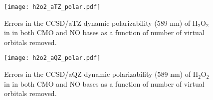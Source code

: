 \begin{figure}
  \centering
  \texttt{[image: h2o2\_aTZ\_polar.pdf]}
  \caption{Errors in the CCSD/aTZ dynamic polarizability (589 nm) of
H$_2$O$_2$ in in both CMO and NO bases as a function of number of virtual orbitals removed.}
   \label{fig:h2o2_aTZ_polar}
\end{figure}
\begin{figure}
  \centering
  \texttt{[image: h2o2\_aQZ\_polar.pdf]}
  \caption{Errors in the CCSD/aQZ dynamic polarizability (589 nm) of
H$_2$O$_2$ in in both CMO and NO bases as a function of number of virtual orbitals removed.}
   \label{fig:h2o2_aQZ_polar}
\end{figure}
